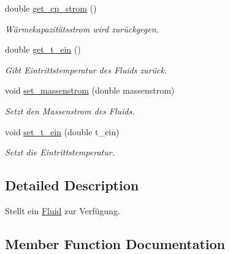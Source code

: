 \begin{DoxyCompactItemize}
double \hyperlink{class_fluid_a5c589565d1bde26bc83125e3e8939796}{get\+\_\+cp\+\_\+strom} ()
\begin{DoxyCompactList}\small\item\em Wärmekapazitätsstrom wird zurückgegen. \end{DoxyCompactList}\item 
\mbox{\label{class_fluid_a60d0c9269a8c8af00bf8828c7f764537}} 
double \hyperlink{class_fluid_a60d0c9269a8c8af00bf8828c7f764537}{get\+\_\+t\+\_\+ein} ()
\begin{DoxyCompactList}\small\item\em Gibt Eintrittstemperatur des Fluids zurück. \end{DoxyCompactList}\item 
\mbox{\label{class_fluid_af70884f77d5dd43499fcc70969100498}} 
void \hyperlink{class_fluid_af70884f77d5dd43499fcc70969100498}{set\+\_\+massenstrom} (double massenstrom)
\begin{DoxyCompactList}\small\item\em Setzt den Massenstrom des Fluids. \end{DoxyCompactList}\item 
\mbox{\label{class_fluid_a9449846d8fd4bf31d8685eefa55d4a57}} 
void \hyperlink{class_fluid_a9449846d8fd4bf31d8685eefa55d4a57}{set\+\_\+t\+\_\+ein} (double t\+\_\+ein)
\begin{DoxyCompactList}\small\item\em Setzt die Eintrittstemperatur. \end{DoxyCompactList}\end{DoxyCompactItemize}


\subsection{Detailed Description}
Stellt ein \hyperlink{class_fluid}{Fluid} zur Verfügung. 

\subsection{Member Function Documentation}
\mbox{\label{class_fluid_a5c589565d1bde26bc83125e3e8939796}} 
